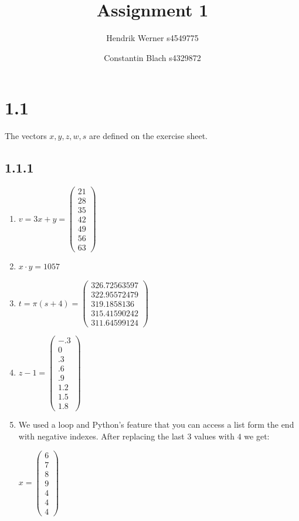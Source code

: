 \documentclass[12pt]{article}
\author{
	Hendrik Werner s4549775
	\and Constantin Blach s4329872
}
\title{Assignment 1}
\begin{document}
\maketitle

\section*{1.1}
The vectors $x, y, z, w, s$ are defined on the exercise sheet.

\subsection*{1.1.1}
\begin{enumerate}[a]
	\item %
	$v = 3x + y =
	\begin{pmatrix}
		21\\ 28\\ 35\\ 42\\ 49\\ 56\\ 63
	\end{pmatrix}$

	\item %
	$x \cdotp y = 1057$

	\item %
	$t = \pi (s + 4) =
	\begin{pmatrix}
		326.72563597\\ 322.95572479\\ 319.1858136\\ 315.41590242\\ 311.64599124
	\end{pmatrix}$

	\item %
	$z - 1 =
	\begin{pmatrix}
		-.3\\ 0\\ .3\\ .6\\ .9\\ 1.2\\ 1.5\\ 1.8
	\end{pmatrix}$

	\item %
	We used a loop and Python's feature that you can access a list form the end with negative indexes. After replacing the last 3 values with $4$ we get:

	$x =
	\begin{pmatrix}
		6\\ 7\\ 8\\ 9\\ 4\\ 4\\ 4
	\end{pmatrix}$


\end{enumerate}
\end{document}
